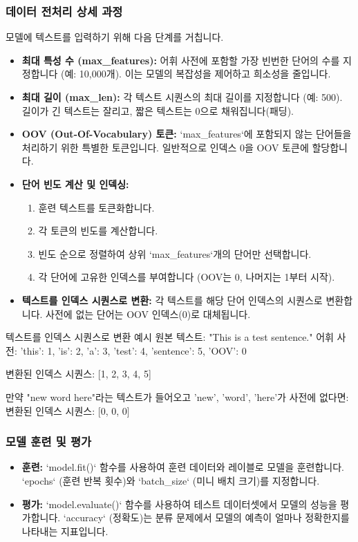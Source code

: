 \documentclass[11pt,a4paper]{article}
\begin{document}
\subsubsection{데이터 전처리 상세 과정}
모델에 텍스트를 입력하기 위해 다음 단계를 거칩니다.
\begin{itemize}
    \item \textbf{최대 특성 수 (max\_features):} 어휘 사전에 포함할 가장 빈번한 단어의 수를 지정합니다 (예: 10,000개). 이는 모델의 복잡성을 제어하고 희소성을 줄입니다.
    \item \textbf{최대 길이 (max\_len):} 각 텍스트 시퀀스의 최대 길이를 지정합니다 (예: 500). 길이가 긴 텍스트는 잘리고, 짧은 텍스트는 0으로 채워집니다(패딩).
    \item \textbf{OOV (Out-Of-Vocabulary) 토큰:} `max_features`에 포함되지 않는 단어들을 처리하기 위한 특별한 토큰입니다. 일반적으로 인덱스 0을 OOV 토큰에 할당합니다.
    \item \textbf{단어 빈도 계산 및 인덱싱:}
        \begin{enumerate}
            \item 훈련 텍스트를 토큰화합니다.
            \item 각 토큰의 빈도를 계산합니다.
            \item 빈도 순으로 정렬하여 상위 `max_features`개의 단어만 선택합니다.
            \item 각 단어에 고유한 인덱스를 부여합니다 (OOV는 0, 나머지는 1부터 시작).
        \end{enumerate}
    \item \textbf{텍스트를 인덱스 시퀀스로 변환:} 각 텍스트를 해당 단어 인덱스의 시퀀스로 변환합니다. 사전에 없는 단어는 OOV 인덱스(0)로 대체됩니다.
\end{itemize}

\begin{examplebox}{텍스트를 인덱스 시퀀스로 변환 예시}
원본 텍스트: "This is a test sentence."
어휘 사전: {'this': 1, 'is': 2, 'a': 3, 'test': 4, 'sentence': 5, 'OOV': 0}

변환된 인덱스 시퀀스: [1, 2, 3, 4, 5]

만약 "new word here"라는 텍스트가 들어오고 'new', 'word', 'here'가 사전에 없다면:
변환된 인덱스 시퀀스: [0, 0, 0]
\end{examplebox}

\subsubsection{모델 훈련 및 평가}
\begin{itemize}
    \item \textbf{훈련:} `model.fit()` 함수를 사용하여 훈련 데이터와 레이블로 모델을 훈련합니다. `epochs` (훈련 반복 횟수)와 `batch_size` (미니 배치 크기)를 지정합니다.
    \item \textbf{평가:} `model.evaluate()` 함수를 사용하여 테스트 데이터셋에서 모델의 성능을 평가합니다. `accuracy` (정확도)는 분류 문제에서 모델의 예측이 얼마나 정확한지를 나타내는 지표입니다.
\end{itemize}
\end{document}
